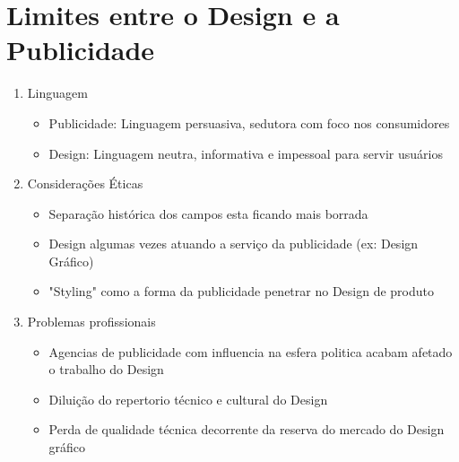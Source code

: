 \documentclass{article}
\begin{document}
\section{Limites entre o Design e a Publicidade}
\begin{enumerate}
    \item Linguagem
    \begin{itemize}
        \item Publicidade: Linguagem persuasiva, sedutora com foco nos consumidores
        \item Design: Linguagem neutra, informativa e impessoal para servir usuários
    \end{itemize}
    \item Considerações Éticas
    \begin{itemize}
        \item Separação histórica dos campos esta ficando mais borrada
        \item Design algumas vezes atuando a serviço da publicidade (ex: Design Gráfico)
        \item "Styling" como a forma da publicidade penetrar no Design de produto
    \end{itemize}
    \item Problemas profissionais
    \begin{itemize}
        \item Agencias de publicidade com influencia na esfera politica acabam afetado o trabalho do Design
        \item Diluição do repertorio técnico e cultural do Design
        \item Perda de qualidade técnica decorrente da reserva do mercado do Design gráfico
    \end{itemize}
\end{enumerate}
\newpage
\end{document}
